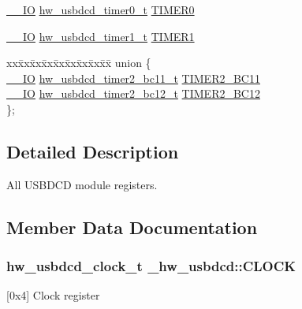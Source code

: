 \begin{DoxyCompactItemize}
\item 
\hyperlink{core__sc300_8h_aec43007d9998a0a0e01faede4133d6be}{\+\_\+\+\_\+\+IO} \hyperlink{union__hw__usbdcd__timer0}{hw\+\_\+usbdcd\+\_\+timer0\+\_\+t} \hyperlink{struct__hw__usbdcd_ae5ff6451ffa4731fa90fc26d9e75e289}{T\+I\+M\+E\+R0}
\item 
\hyperlink{core__sc300_8h_aec43007d9998a0a0e01faede4133d6be}{\+\_\+\+\_\+\+IO} \hyperlink{union__hw__usbdcd__timer1}{hw\+\_\+usbdcd\+\_\+timer1\+\_\+t} \hyperlink{struct__hw__usbdcd_ad63cc9e587f35c927ca09ff525f3ea97}{T\+I\+M\+E\+R1}
\item 
\begin{tabbing}
xx\=xx\=xx\=xx\=xx\=xx\=xx\=xx\=xx\=\kill
union \{\\
\>\hyperlink{core__sc300_8h_aec43007d9998a0a0e01faede4133d6be}{\_\_IO} \hyperlink{union__hw__usbdcd__timer2__bc11}{hw\_usbdcd\_timer2\_bc11\_t} \hyperlink{struct__hw__usbdcd_a54053d63141dd3a056b4b70c97455871}{TIMER2\_BC11}\\
\>\hyperlink{core__sc300_8h_aec43007d9998a0a0e01faede4133d6be}{\_\_IO} \hyperlink{union__hw__usbdcd__timer2__bc12}{hw\_usbdcd\_timer2\_bc12\_t} \hyperlink{struct__hw__usbdcd_ac27d45a3e7202a08ea04c42126f4c20c}{TIMER2\_BC12}\\
\}; \hypertarget{struct__hw__usbdcd_ae35b1dbac0f57d32dafd9be400399970}{}\label{struct__hw__usbdcd_ae35b1dbac0f57d32dafd9be400399970}
\\

\end{tabbing}\end{DoxyCompactItemize}


\subsection{Detailed Description}
All U\+S\+B\+D\+CD module registers. 

\subsection{Member Data Documentation}
\subsubsection[{\texorpdfstring{C\+L\+O\+CK}{CLOCK}}]{ {\bf hw\+\_\+usbdcd\+\_\+clock\+\_\+t} \+\_\+hw\+\_\+usbdcd\+::\+C\+L\+O\+CK}\hypertarget{struct__hw__usbdcd_afd5f2fb1b08175e06933005876fb237c}{}\label{struct__hw__usbdcd_afd5f2fb1b08175e06933005876fb237c}
\mbox{[}0x4\mbox{]} Clock register 
